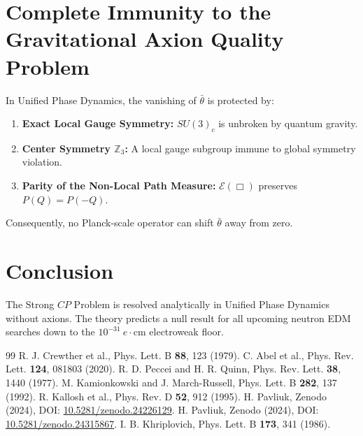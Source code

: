 \documentclass[11pt,a4paper]{article}
\begin{document}
\section{Complete Immunity to the Gravitational Axion Quality Problem}
In Unified Phase Dynamics, the vanishing of $\bar{\theta}$ is protected by:
\begin{enumerate}
    \item \textbf{Exact Local Gauge Symmetry:} $SU(3)_c$ is unbroken by quantum gravity.
    \item \textbf{Center Symmetry $\mathbb{Z}_3$:} A local gauge subgroup immune to global symmetry violation.
    \item \textbf{Parity of the Non-Local Path Measure:} $\mathcal{E}(\Box)$ preserves $P(Q) = P(-Q)$.
\end{enumerate}
Consequently, no Planck-scale operator can shift $\bar{\theta}$ away from zero.

\section{Conclusion}
The Strong $CP$ Problem is resolved analytically in Unified Phase Dynamics without axions. The theory predicts a null result for all upcoming neutron EDM searches down to the $10^{-31}\ e\cdot\text{cm}$ electroweak floor.

\begin{thebibliography}{99}
 R. J. Crewther et al., Phys. Lett. B \textbf{88}, 123 (1979).
 C. Abel et al., Phys. Rev. Lett. \textbf{124}, 081803 (2020).
 R. D. Peccei and H. R. Quinn, Phys. Rev. Lett. \textbf{38}, 1440 (1977).
 M. Kamionkowski and J. March-Russell, Phys. Lett. B \textbf{282}, 137 (1992).
 R. Kallosh et al., Phys. Rev. D \textbf{52}, 912 (1995).
 H. Pavliuk, Zenodo (2024), DOI: \href{https://doi.org/10.5281/zenodo.24226129}{10.5281/zenodo.24226129}.
 H. Pavliuk, Zenodo (2024), DOI: \href{https://doi.org/10.5281/zenodo.24315867}{10.5281/zenodo.24315867}.
 I. B. Khriplovich, Phys. Lett. B \textbf{173}, 341 (1986).
\end{thebibliography}
\end{document}
